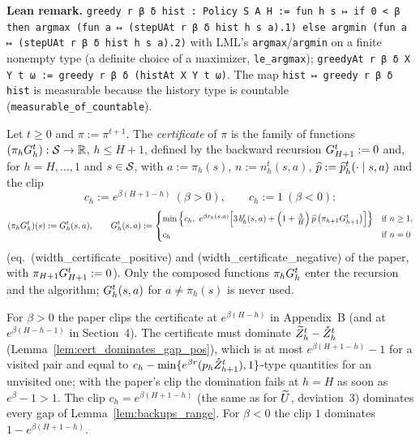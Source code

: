 \textbf{Lean remark.} \texttt{greedy r β δ hist : Policy S A H := fun h s ↦ if 0 < β then argmax (fun a ↦ (stepUAt r β δ hist h s a).1) else argmin (fun a ↦ (stepUAt r β δ hist h s a).2)}
with LML's \texttt{argmax}/\texttt{argmin} on a finite nonempty type (a definite choice of a
maximizer, \texttt{le\_argmax}); \texttt{greedyAt r β δ X Y t ω := greedy r β δ (histAt X Y t ω)}.
The map \texttt{hist ↦ greedy r β δ hist} is measurable because the history type is countable
(\texttt{measurable\_of\_countable}).

\begin{definition}[Certificate]\label{def:certificate}
\leanok
{}
Let $t \ge 0$ and $\pi := \pi^{t+1}$. The \emph{certificate} of $\pi$ is the family of functions
$(\pi_h G^t_h) : \mathcal{S} \to \mathbb{R}$, $h \le H + 1$, defined by the backward recursion
$G^t_{H+1} := 0$ and, for $h = H, \dots, 1$ and $s \in \mathcal{S}$, with $a := \pi_h(s)$,
$n := n_h^t(s, a)$, $\widehat{p} := \widehat{p}_h^t(\cdot \mid s, a)$ and the clip
\[
  c_h := e^{\beta(H + 1 - h)} \ (\beta > 0), \qquad c_h := 1 \ (\beta < 0):
\]
\[
  (\pi_h G^t_h)(s) := G^t_h(s, a),
  \qquad
  G^t_h(s, a) :=
  \begin{cases}
    \min\Big\{ c_h,\ e^{\beta r_h(s, a)} \Big[ 3\, b_h^t(s, a) + \Big(1 + \frac3H\Big)\, \widehat{p}\,\big(\pi_{h+1}G^t_{h+1}\big) \Big] \Big\} & \text{if } n \ge 1, \\[4pt]
    c_h & \text{if } n = 0
  \end{cases}
\]
(eq.~(width\_certificate\_positive) and (width\_certificate\_negative) of the paper, with
$\pi_{H+1}G^t_{H+1} := 0$). Only the composed functions $\pi_h G^t_h$ enter the
recursion and the algorithm; $G^t_h(s, a)$ for $a \ne \pi_h(s)$ is never used.
\end{definition}

\begin{remark}\label{rem:algorithm_cert_clip}
For $\beta > 0$ the paper clips the certificate at $e^{\beta(H - h)}$ in Appendix~B (and at
$e^{\beta(H - h - 1)}$ in Section~4). The certificate must dominate $\widetilde{Z}^t_h - \mathring{Z}^t_h$
(Lemma~\ref{lem:cert_dominates_gap_pos}), which is at most $e^{\beta(H + 1 - h)} - 1$ for a visited
pair and equal to $c_h - \min\{e^{\beta r}(p_h \mathring{Z}^t_{h+1}), 1\}$-type quantities for an unvisited
one; with the paper's clip the domination fails at $h = H$ as soon as $e^{\beta} - 1 > 1$. The
clip $c_h = e^{\beta(H + 1 - h)}$ (the same as for $\widetilde{U}$, deviation~3) dominates every gap of
Lemma~\ref{lem:backups_range}. For $\beta < 0$ the clip $1$ dominates $1 - e^{\beta(H + 1 - h)}$.
\end{remark}

